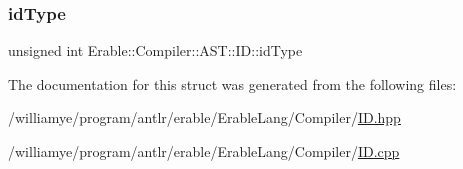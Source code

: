 \subsubsection{\texorpdfstring{idType}{idType}}
{\footnotesize\ttfamily unsigned int Erable\+::\+Compiler\+::\+A\+S\+T\+::\+I\+D\+::id\+Type}



The documentation for this struct was generated from the following files\+:\begin{DoxyCompactItemize}
\item 
/williamye/program/antlr/erable/\+Erable\+Lang/\+Compiler/\mbox{\hyperlink{_i_d_8hpp}{I\+D.\+hpp}}\item 
/williamye/program/antlr/erable/\+Erable\+Lang/\+Compiler/\mbox{\hyperlink{_i_d_8cpp}{I\+D.\+cpp}}\end{DoxyCompactItemize}
